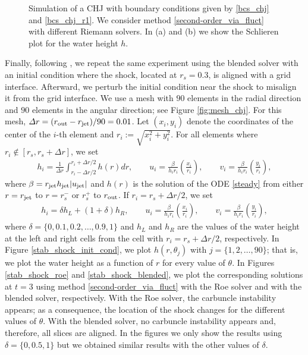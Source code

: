 \documentclass[preprint, 11pt]{article}
\newcommand{\out}{\textup{out}}
\newcommand{\jet}{{\textup{jet}}}
\begin{document}
\begin{figure}[!h]
{\begin{tabular}{c}
    \end{tabular}
  }
    \caption{Simulation of a CHJ with boundary conditions given by \eqref{bcs_chj} and \eqref{bcs_chj_r1}.    
      We consider method \eqref{second-order_via_fluct} with different Riemann solvers.
      In (a) and (b) we show the Schlieren plot for the water height $h$.
    \label{fig:chj_r1}}
\end{figure}

{\color{red}
  Finally, following \cite[Section III B]{kitamura2009evaluation}, we repeat the same experiment using
  the blended solver with an initial condition where the shock,
  located at $r_s=0.3$, is aligned with a grid interface. Afterward, we perturb the initial condition near the shock to misalign it
  from the grid interface. We use a mesh with $90$ elements in the radial direction and $90$ elements in the angular direction;
  see Figure \ref{fig:mesh_chj}.
  For this mesh, $\Delta r=(r_\out-r_\jet)/90=0.01$. 
  Let $(x_i,y_i)$ denote the coordinates of the center of the $i$-th element and $r_i:=\sqrt{x_i^2+y_i^2}$.
  For all elements where $r_i\not\in[r_s,r_s+\Delta r]$, we set
  \begin{align*}
    h_i = \frac{1}{\Delta r}\int_{r_i-\Delta r/2}^{r_i+\Delta r/2}h(r) dr,
    \qquad
    u_i = \frac{\beta}{h_ir_i}\left(\frac{x_i}{r_i}\right),
    \qquad
    v_i = \frac{\beta}{h_ir_i}\left(\frac{y_i}{r_i}\right),
  \end{align*}
  where $\beta=r_\jet h_\jet |u_\jet|$ and $h(r)$ is the solution of the ODE \eqref{steady} from either
  $r=r_\jet$ to $r=r_s^-$ or $r_s^+$ to $r_\out$.
  If $r_i = r_s+\Delta r/2$, we set
  \begin{align*}
    h_i = \delta h_L + (1+\delta) h_R,
    \qquad
    u_i = \frac{\beta}{h_ir_i}\left(\frac{x_i}{r_i}\right),
    \qquad
    v_i = \frac{\beta}{h_ir_i}\left(\frac{y_i}{r_i}\right),
  \end{align*}
  where $\delta=\{0,0.1,0.2,\dots,0.9,1\}$ and $h_L$ and $h_R$ are the values of the water height
  at the left and right cells from the cell with $r_i=r_s+\Delta r/2$, respectively.
  In Figure \ref{stab_shock_init_cond}, we plot $h(r,\theta_j)$ with $j=\{1,2,\dots,90\}$; that is,
  we plot the water height as a function of $r$ for every value of $\theta$.
  In Figures \ref{stab_shock_roe} and \ref{stab_shock_blended}, we plot the corresponding solutions at
  $t=3$ using method \eqref{second-order_via_fluct} with the Roe solver and with the blended solver,
  respectively. With the Roe solver, the carbuncle instability appears; as a consequence, the
  location of the shock changes for the different values of $\theta$.
  With the blended solver, no carbuncle instability appears and, therefore, all slices are aligned.
  In the figures we only show the results using $\delta=\{0,0.5,1\}$ but we
  obtained similar results with the other values of $\delta$. 
  
}
\end{document}

